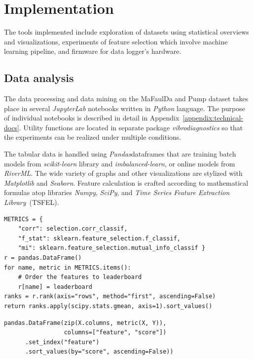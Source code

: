 \chapter{Implementation} \label{chapter:implementation}
The tools implemented include exploration of datasets using statistical overviews and visualizations, experiments of feature selection which involve machine learning pipeline, and firmware for data logger's hardware. 

\section{Data analysis}
The data processing and data mining on the MaFaulDa and Pump dataset takes place in several \emph{JupyterLab} notebooks written in \emph{Python} language. The purpose of individual notebooks is described in detail in Appendix~\ref{appendix:technical-docs}. Utility functions are located in separate package \emph{vibrodiagnostics} so that the experiments can be realized under multiple conditions.

The tabular data is handled using \emph{Pandas}dataframes that are training batch models from \emph{scikit-learn} library and \emph{imbalanced-learn}, or online models from \emph{RiverML}. The wide variety of graphs and other visualizations are stylized with \emph{Matplotlib} and \emph{Seaborn}. Feature calculation is crafted according to mathematical formulas atop libraries \emph{Numpy}, \emph{SciPy}, and \emph{Time Series Feature Extraction Library}~(TSFEL).

\begin{lstlisting}[style=pythonstyle,caption=Rank product of feature matrix X to label column Y,label={lst:rank-product},morekeywords={DataFrame,rank,set_index,sort_values,gmean}]
METRICS = {
    "corr": selection.corr_classif, 
    "f_stat": sklearn.feature_selection.f_classif, 
    "mi": sklearn.feature_selection.mutual_info_classif }
r = pandas.DataFrame()
for name, metric in METRICS.items():
    # Order the features to leaderboard
    r[name] = leaderboard  
ranks = r.rank(axis="rows", method="first", ascending=False)
return ranks.apply(scipy.stats.gmean, axis=1).sort_values()
\end{lstlisting}

\begin{lstlisting}[style=pythonstyle,caption=Leaderboard of feature importance metric scores,label={lst:feature-leaderboard},morekeywords={DataFrame,rank,set_index,sort_values,metric,gmean}]
pandas.DataFrame(zip(X.columns, metric(X, Y)), 
                 columns=["feature", "score"])
      .set_index("feature")
      .sort_values(by="score", ascending=False))
\end{lstlisting}

